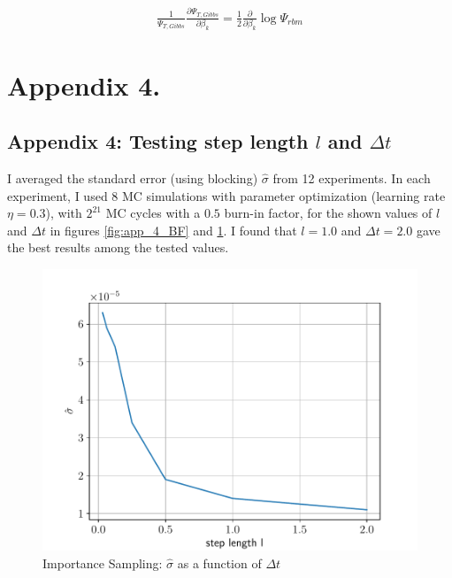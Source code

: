 \documentclass[%
oneside,                 %
final,                   %
10pt]{article}
\begin{document}
\begin{appendices}
\begin{equation}
\begin{aligned}
 \frac{1}{\Psi_{T,Gibbs} }\frac{\partial \Psi_{T,Gibbs} }{\partial \beta_k}=\frac{1}{2}\frac{\partial}{\partial \beta_k} \log \Psi_{rbm}
\end{aligned}
\end{equation}

\section{Appendix 4.} \label{APP_4}
\subsection{Appendix 4: Testing step length $l$ and $\Delta t$}
 I averaged the standard error (using blocking) $\hat \sigma$ from 12 experiments. In each experiment, I used $8$ MC simulations with parameter optimization (learning rate $\eta =0.3$), with $2^{21}$ MC cycles with a $0.5$ burn-in factor, for the shown values of $l$ and $\Delta t$ in figures \ref{fig:app_4_BF} and  \ref{fig:app_4_IS}.
I found that $l=1.0$ and $\Delta t = 2.0$ gave the best results among the tested values.
\begin{figure}[H]
        \centering 
         \includegraphics[scale=0.6]{../Results/sim_2/error.pdf} 
        \caption{Importance Sampling: $\hat \sigma$ as a function of $\Delta t$}
        \label{fig:app_4_IS}   
\end{figure}  


\end{appendices}
\end{document}
